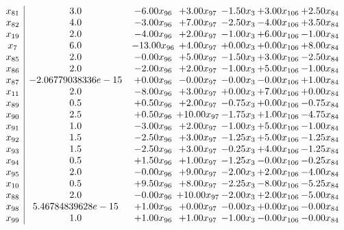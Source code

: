\documentclass[8pt]{article}
\begin{document}
\[\begin{array}{c| c c@{\hskip 2pt} c@{\hskip 2pt} c@{\hskip 2pt} c@{\hskip 2pt} c@{\hskip 2pt} }
 x_{81}   &  3.0 & -6.00 x_{96} & +  3.00 x_{97} & -1.50 x_{3} & +  3.00 x_{106} & +  2.50 x_{84}\\
 x_{82}   &  4.0 & -3.00 x_{96} & +  7.00 x_{97} & -2.50 x_{3} & -4.00 x_{106} & +  3.50 x_{84}\\
 x_{19}   &  2.0 & -4.00 x_{96} & +  2.00 x_{97} & -1.00 x_{3} & +  6.00 x_{106} & -1.00 x_{84}\\
 x_{7}   &  6.0 & -13.00 x_{96} & +  4.00 x_{97} & +  0.00 x_{3} & +  0.00 x_{106} & +  8.00 x_{84}\\
 x_{85}   &  2.0 & -0.00 x_{96} & +  5.00 x_{97} & -1.50 x_{3} & +  3.00 x_{106} & -2.50 x_{84}\\
 x_{86}   &  2.0 & -2.00 x_{96} & +  2.00 x_{97} & -1.00 x_{3} & +  5.00 x_{106} & -1.00 x_{84}\\
 x_{87}   &  -2.06779038336e-15 & +  0.00 x_{96} & -0.00 x_{97} & -0.00 x_{3} & -0.00 x_{106} & +  1.00 x_{84}\\
 x_{11}   &  2.0 & -8.00 x_{96} & +  3.00 x_{97} & +  0.00 x_{3} & +  7.00 x_{106} & +  0.00 x_{84}\\
 x_{89}   &  0.5 & +  0.50 x_{96} & +  2.00 x_{97} & -0.75 x_{3} & +  0.00 x_{106} & -0.75 x_{84}\\
 x_{90}   &  2.5 & +  0.50 x_{96} & + 10.00 x_{97} & -1.75 x_{3} & +  1.00 x_{106} & -4.75 x_{84}\\
 x_{91}   &  1.0 & -3.00 x_{96} & +  2.00 x_{97} & -1.00 x_{3} & +  5.00 x_{106} & -1.00 x_{84}\\
 x_{92}   &  1.5 & -2.50 x_{96} & +  3.00 x_{97} & -1.25 x_{3} & +  5.00 x_{106} & -1.25 x_{84}\\
 x_{93}   &  1.5 & -2.50 x_{96} & +  3.00 x_{97} & -0.25 x_{3} & +  4.00 x_{106} & -1.25 x_{84}\\
 x_{94}   &  0.5 & +  1.50 x_{96} & +  1.00 x_{97} & -1.25 x_{3} & -0.00 x_{106} & -0.25 x_{84}\\
 x_{95}   &  2.0 & -0.00 x_{96} & +  9.00 x_{97} & -2.00 x_{3} & +  2.00 x_{106} & -4.00 x_{84}\\
 x_{10}   &  0.5 & +  9.50 x_{96} & +  8.00 x_{97} & -2.25 x_{3} & -8.00 x_{106} & -5.25 x_{84}\\
 x_{88}   &  2.0 & -0.00 x_{96} & + 10.00 x_{97} & -2.00 x_{3} & +  2.00 x_{106} & -5.00 x_{84}\\
 x_{98}   &  5.46784839628e-15 & +  1.00 x_{96} & +  0.00 x_{97} & -0.00 x_{3} & +  0.00 x_{106} & -0.00 x_{84}\\
 x_{99}   &  1.0 & +  1.00 x_{96} & +  1.00 x_{97} & -1.00 x_{3} & -0.00 x_{106} & -0.00 x_{84}\\

\end{array}\]
\end{document}
